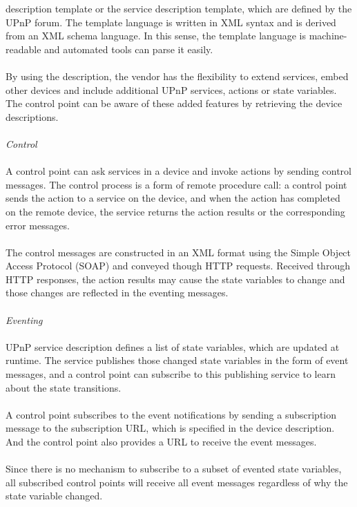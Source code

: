description template or the service description template, which are defined by
the UPnP forum. The template language is written in XML syntax and is derived from an XML schema language. In this sense, the template language is machine-readable and automated tools can parse it easily. \\
\\
By using the description, the vendor has the flexibility to extend services, embed other devices and include 
additional UPnP services, actions or state variables. The control point can be
aware of these added features by retrieving the device descriptions. \\
\\
\emph{Control} \\ 
\\
A control point can ask services in a device and invoke actions by sending
control messages. The control process is a form of remote procedure call: a
control point sends the action to a service on the device, and when the action has completed on the remote device, the service returns the action results or the corresponding error messages. \\
\\
The control messages are constructed in an XML format using the Simple Object
Access Protocol (SOAP) and conveyed though HTTP requests. Received through HTTP
responses, the action results may cause the state variables to change and those changes are reflected in the eventing messages. \\
\\
\emph{Eventing} \\
\\ 
UPnP service description defines a list of state variables, which are updated at runtime. The service 
publishes those changed state variables in the form of event messages, and a control point can 
subscribe to this publishing service to learn about the state transitions. \\
\\
A control point subscribes to the event notifications by sending a subscription message to the 
subscription URL, which is specified in the device description. And the control
point also provides a URL to receive the event messages. \\
\\
Since there is no mechanism to subscribe to a subset of evented state variables, all subscribed 
control points will receive all event messages regardless of why the state
variable changed. \\
